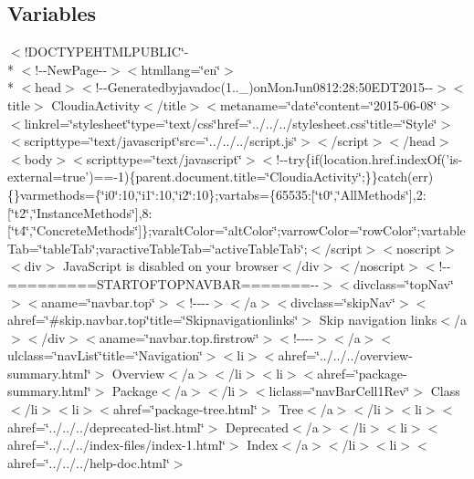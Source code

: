 \subsection*{Variables}
\begin{DoxyCompactItemize}
\item 
$<$!D\-O\-C\-T\-Y\-P\-E\-H\-T\-M\-L\-P\-U\-B\-L\-I\-C\char`\"{}-\/\\*
$<$!-\/-\/New\-Page-\/-\/$>$$<$htmllang=\char`\"{}en\char`\"{}$>$\\*
$<$head$>$$<$!-\/-\/Generatedbyjavadoc(1..\-\_)on\-Mon\-Jun0812\-:28\-:50\-E\-D\-T2015-\/-\/$>$$<$title$>$ Cloudia\-Activity$<$/title$>$$<$metaname=\char`\"{}date\char`\"{}content=\char`\"{}2015-\/06-\/08\char`\"{}$>$$<$linkrel=\char`\"{}stylesheet\char`\"{}type=\char`\"{}text/css\char`\"{}href=\char`\"{}../../../stylesheet.\-css\char`\"{}title=\char`\"{}\-Style\char`\"{}$>$$<$scripttype=\char`\"{}text/javascript\char`\"{}src=\char`\"{}../../../script.\-js\char`\"{}$>$$<$/script$>$$<$/head$>$$<$body$>$$<$scripttype=\char`\"{}text/javascript\char`\"{}$>$$<$!-\/-\/try\{if(location.\-href.\-index\-Of('is-\/external=true')==-\/1)\{parent.\-document.\-title=\char`\"{}\-Cloudia\-Activity\char`\"{};\}\}catch(err)\{\}varmethods=\{\char`\"{}i0\char`\"{}\-:10,\char`\"{}i1\char`\"{}\-:10,\char`\"{}i2\char`\"{}\-:10\};vartabs=\{65535\-:\mbox{[}\char`\"{}t0\char`\"{},\char`\"{}\-All\-Methods\char`\"{}\mbox{]},2\-:\mbox{[}\char`\"{}t2\char`\"{},\char`\"{}\-Instance\-Methods\char`\"{}\mbox{]},8\-:\mbox{[}\char`\"{}t4\char`\"{},\char`\"{}\-Concrete\-Methods\char`\"{}\mbox{]}\};varalt\-Color=\char`\"{}alt\-Color\char`\"{};varrow\-Color=\char`\"{}row\-Color\char`\"{};vartable\-Tab=\char`\"{}table\-Tab\char`\"{};varactive\-Table\-Tab=\char`\"{}active\-Table\-Tab\char`\"{};$<$/script$>$$<$noscript$>$$<$div$>$ Java\-Script is disabled on your browser$<$/div$>$$<$/noscript$>$$<$!-\/-\/=========\-S\-T\-A\-R\-T\-O\-F\-T\-O\-P\-N\-A\-V\-B\-A\-R=======-\/-\/$>$$<$divclass=\char`\"{}top\-Nav\char`\"{}$>$$<$aname=\char`\"{}navbar.\-top\char`\"{}$>$$<$!-\/-\/-\/-\/$>$$<$/a$>$$<$divclass=\char`\"{}skip\-Nav\char`\"{}$>$$<$ahref=\char`\"{}\#skip.\-navbar.\-top\char`\"{}title=\char`\"{}\-Skipnavigationlinks\char`\"{}$>$ Skip navigation links$<$/a$>$$<$/div$>$$<$aname=\char`\"{}navbar.\-top.\-firstrow\char`\"{}$>$$<$!-\/-\/-\/-\/$>$$<$/a$>$$<$ulclass=\char`\"{}nav\-List\char`\"{}title=\char`\"{}\-Navigation\char`\"{}$>$$<$li$>$$<$ahref=\char`\"{}../../../overview-\/summary.\-html\char`\"{}$>$ Overview$<$/a$>$$<$/li$>$$<$li$>$$<$ahref=\char`\"{}package-\/summary.\-html\char`\"{}$>$ Package$<$/a$>$$<$/li$>$$<$liclass=\char`\"{}nav\-Bar\-Cell1\-Rev\char`\"{}$>$ Class$<$/li$>$$<$li$>$$<$ahref=\char`\"{}package-\/tree.\-html\char`\"{}$>$ Tree$<$/a$>$$<$/li$>$$<$li$>$$<$ahref=\char`\"{}../../../deprecated-\/list.\-html\char`\"{}$>$ Deprecated$<$/a$>$$<$/li$>$$<$li$>$$<$ahref=\char`\"{}../../../index-\/files/index-\/1.\-html\char`\"{}$>$ Index$<$/a$>$$<$/li$>$$<$li$>$$<$ahref=\char`\"{}../../../help-\/doc.\-html\char`\"{}$>$ $$
\end{DoxyCompactItemize}
